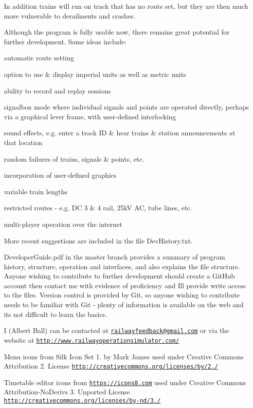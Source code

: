 In addition trains will run on track that has no route set, but they are then much more vulnerable to derailments and crashes.

Although the program is fully usable now, there remains great potential for further development. Some ideas include\+:


\begin{DoxyItemize}
\item automatic route setting
\item option to use \& display imperial units as well as metric units
\item ability to record and replay sessions
\item signalbox mode where individual signals and points are operated directly, perhaps via a graphical lever frame, with user-\/defined interlocking
\item sound effects, e.\+g. enter a track ID \& hear trains \& station announcements at that location
\item random failures of trains, signals \& points, etc.
\item incorporation of user-\/defined graphics
\item variable train lengths
\item restricted routes -\/ e.\+g. DC 3 \& 4 rail, 25kV AC, tube lines, etc.
\item multi-\/player operation over the internet
\end{DoxyItemize}

More recent suggestions are included in the file Dev\+History.\+txt.

\textquotesingle{}Developer\+Guide.\+pdf\textquotesingle{} in the \textquotesingle{}master\textquotesingle{} branch provides a summary of program history, structure, operation and interfaces, and also explains the file structure. Anyone wishing to contribute to further development should create a Git\+Hub account then contact me with evidence of proficiency and I\textquotesingle{}ll provide write access to the files. Version control is provided by \textquotesingle{}Git\textquotesingle{}, so anyone wishing to contribute needs to be familiar with \textquotesingle{}Git\textquotesingle{} -\/ plenty of information is available on the web and it\textquotesingle{}s not difficult to learn the basics.

I (Albert Ball) can be contacted at \href{mailto:railwayfeedback@gmail.com}{\tt railwayfeedback@gmail.\+com} or via the website at \href{http://www.railwayoperationsimulator.com/}{\tt http\+://www.\+railwayoperationsimulator.\+com/}

Menu icons from Silk Icon Set 1. by Mark James used under Creative Commons Attribution 2. License \href{http://creativecommons.org/licenses/by/2.5/}{\tt http\+://creativecommons.\+org/licenses/by/2./}

Timetable editor icons from \href{https://icons8.com}{\tt https\+://icons8.\+com} used under Creative Commons Attribution-\/\+No\+Derivs 3. Unported License \href{http://creativecommons.org/licenses/by-nd/3.0/}{\tt http\+://creativecommons.\+org/licenses/by-\/nd/3./} 